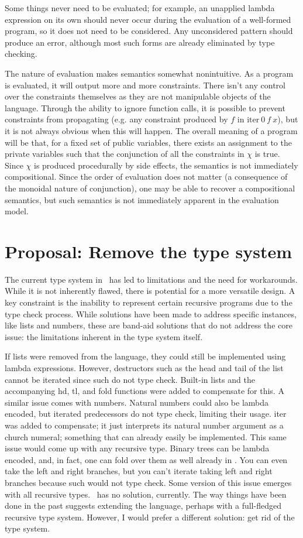 \documentclass[
    9pt,            %
    techreport,        %
    affiltop,       %
]{art}
\begin{document}
Some things never need to be evaluated; for example, an unapplied lambda expression on its own should never occur during the evaluation of a well-formed program, so it does not need to be considered. Any unconsidered pattern should produce an error, although most such forms are already eliminated by type checking.

The nature of evaluation makes semantics somewhat nonintuitive. As a program is evaluated, it will output more and more constraints. There isn't any control over the constraints themselves as they are not manipulable objects of the language. Through the ability to ignore function calls, it is possible to prevent constraints from propagating (e.g. any constraint produced by $f$ in $\text{iter}\ 0\ f\ x$), but it is not always obvious when this will happen. The overall meaning of a program will be that, for a fixed set of public variables, there exists an assignment to the private variables such that the conjunction of all the constraints in $\chi$ is true. Since $\chi$ is produced procedurally by side effects, the semantics is not immediately compositional. Since the order of evaluation does not matter (a consequence of the monoidal nature of conjunction), one may be able to recover a compositional semantics, but such semantics is not immediately apparent in the evaluation model.

\section{Proposal: Remove the type system}

The current type system in \VampIR{}\ has led to limitations and the need for workarounds. While it is not inherently flawed, there is potential for a more versatile design. A key constraint is the inability to represent certain recursive programs due to the type check process. While solutions have been made to address specific instances, like lists and numbers, these are band-aid solutions that do not address the core issue: the limitations inherent in the type system itself. 

If lists were removed from the language, they could still be implemented using lambda expressions. However, destructors such as the head and tail of the list cannot be iterated since such do not type check. Built-in lists and the accompanying hd, tl, and fold functions were added to compensate for this. A similar issue comes with numbers. Natural numbers could also be lambda encoded, but iterated predecessors do not type check, limiting their usage. iter was added to compensate; it just interprets its natural number argument as a church numeral; something that can already easily be implemented. This same issue would come up with any recursive type. Binary trees can be lambda encoded, and, in fact, one can fold over them as well already in \VampIR{}. You can even take the left and right branches, but you can't iterate taking left and right branches because such would not type check. Some version of this issue emerges with all recursive types. \VampIR{}\ has no solution, currently. The way things have been done in the past suggests extending the language, perhaps with a full-fledged recursive type system. However, I would prefer a different solution: get rid of the type system.
\end{document}
